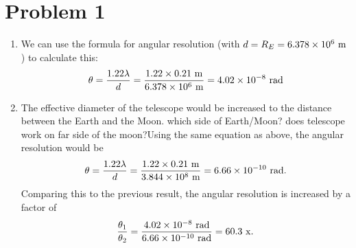 \documentclass[11pt,letterpaper]{article}
\begin{document}
\section*{Problem 1}
\begin{enumerate}[label=(\alph*)]

\item We can use the formula for angular resolution (with $d=R_E=6.378\times 10^{6}~{\rm m}$) to calculate this:
    \begin{align*}
        \theta = \frac{1.22\lambda}{d} = \frac{1.22\times 0.21~{\rm m}}{6.378\times 10^{6}~{\rm m}} = 4.02\times 10^{-8}~{\rm rad}
    \end{align*} 

\item The effective diameter of the telescope would be increased to the distance between the Earth and the Moon. {\huge which side of Earth/Moon? does telescope work on far side of the moon?}Using the same equation as above, the angular resolution would be 
    \begin{align*}
        \theta = \frac{1.22\lambda}{d} = \frac{1.22\times 0.21~{\rm m}}{3.844\times 10^{8}~{\rm m}} = 6.66\times 10^{-10}~{\rm rad}.
    \end{align*}
    Comparing this to the previous result, the angular resolution is increased by a factor of 
    \begin{align*}
        \frac{\theta_1}{\theta_2} = \frac{4.02\times 10^{-8}~{\rm rad}}{6.66\times 10^{-10}~{\rm rad}} = 60.3~{\rm x}.
    \end{align*}

\end{enumerate}

\end{document}
